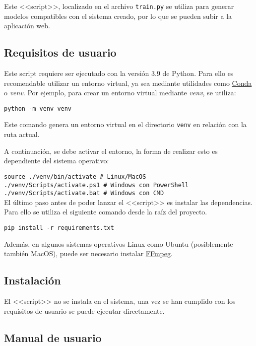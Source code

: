 Este <<script>>, localizado en el archivo \texttt{train.py} se utiliza para
generar modelos compatibles con el sistema creado, por lo que se pueden subir a
la aplicación web.

\subsection{Requisitos de usuario}

Este script requiere ser ejecutado con la versión 3.9 de Python. Para ello es
recomendable utilizar un entorno virtual, ya sea mediante utilidades como
\href{https://docs.conda.io/en/latest/}{Conda} o \textit{venv}. Por
ejemplo, para crear un entorno virtual mediante \textit{venv}, se utiliza:

\texttt{python -m venv venv}

Este comando genera un entorno virtual en el directorio \texttt{venv} en
relación con la ruta actual.

A continuación, se debe activar el entorno, la forma de realizar esto es
dependiente del sistema operativo:

\texttt{source ./venv/bin/activate \# Linux/MacOS} \\

\texttt{./venv/Scripts/activate.ps1 \# Windows con PowerShell} \\

\texttt{./venv/Scripts/activate.bat \# Windows con CMD} \\

El último paso antes de poder lanzar el <<script>> es instalar las dependencias.
Para ello se utiliza el siguiente comando desde la raíz del proyecto.

\texttt{pip install -r requirements.txt}

Además, en algunos sistemas operativos Linux como Ubuntu (posiblemente también
MacOS), puede ser necesario instalar \href{https://ffmpeg.org/}{FFmpeg}.

\subsection{Instalación}

El <<script>> no se instala en el sistema, una vez se han cumplido con los
requisitos de usuario se puede ejecutar directamente.

\subsection{Manual de usuario}

